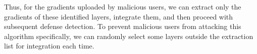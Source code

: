 \documentclass[conference]{IEEEtran}
\begin{document}
    
    
    
    
    
    
    


Thus, for the gradients uploaded by malicious users, we can extract only the gradients of these identified layers, integrate them, and then proceed with subsequent defense detection. To prevent malicious users from attacking this algorithm specifically, we can randomly select some layers outside the extraction list for integration each time.
\end{document}
